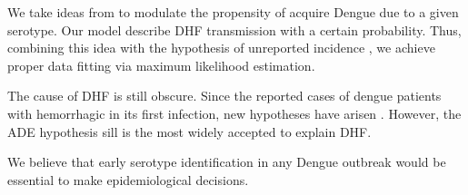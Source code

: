      We take ideas from \citet{Zheng2018, Nuraini2007, Feng1997a} to modulate
the propensity of acquire Dengue due to a given serotype.
Our model describe DHF transmission with a certain probability.
Thus, combining this idea with the hypothesis of unreported
incidence \cite{Li2013b,Guzman2002}, we achieve proper
data fitting via maximum likelihood estimation.

The cause of DHF is still obscure. Since the reported cases of dengue patients
with hemorrhagic in its first infection, new hypotheses have arisen
\cite{Debast1993}.  However, the ADE hypothesis sill is the most widely
accepted to explain DHF.

We believe that early serotype identification in any Dengue outbreak would be
essential to make epidemiological decisions.
